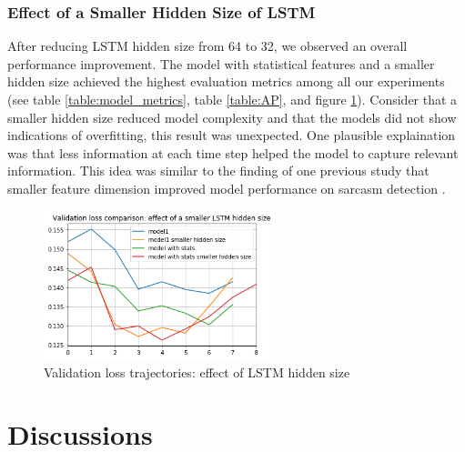 \documentclass[12pt]{diazessay} %
\begin{document}
{%

\subsubsection{Effect of a Smaller Hidden Size of LSTM} %
\label{ssub:effect_of_a_smaller_hidden_size_of_lstm}

After reducing LSTM hidden size from 64 to 32, we observed an overall performance improvement. The model with statistical features and a smaller hidden size achieved the highest evaluation metrics among all our experiments (see table \ref{table:model_metrics}, table \ref{table:AP}, and figure \ref{figure:hidden_size}). Consider that a smaller hidden size reduced model complexity and that the models did not show indications of overfitting, this result was unexpected. One plausible explaination was that less information at each time step helped the model to capture relevant information. This idea was similar to the finding of one previous study that smaller feature dimension improved model performance on sarcasm detection \citep{ghosh2016}. 

\begin{figure}[h!]
    \centering
    \includegraphics[width=0.6\textwidth]{graphs/loss_plots/hidden_size.png}
    \caption{Validation loss trajectories: effect of LSTM hidden size}
    \label{figure:hidden_size}
\end{figure}





\section{Discussions}

}
\end{document}
